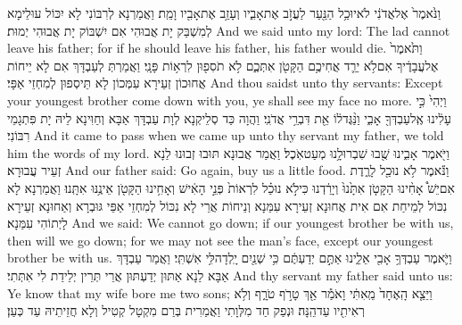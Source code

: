 {וַנֹּ֙אמֶר֙ אֶל\maqqaf אֲדֹנִ֔י לֹא\maqqaf יוּכַ֥ל הַנַּ֖עַר לַעֲזֹ֣ב אֶת\maqqaf אָבִ֑יו וְעָזַ֥ב אֶת\maqqaf אָבִ֖יו וָמֵֽת׃}
{וַאֲמַרְנָא לְרִבּוֹנִי לָא יִכּוֹל עוּלֵימָא לְמִשְׁבַּק יָת אֲבוּהִי אִם יִשְׁבּוֹק יָת אֲבוּהִי יְמוּת׃}
{And we said unto my lord: The lad cannot leave his father; for if he should leave his father, his father would die.}{}
{וַתֹּ֙אמֶר֙ אֶל\maqqaf עֲבָדֶ֔יךָ אִם\maqqaf לֹ֥א יֵרֵ֛ד אֲחִיכֶ֥ם הַקָּטֹ֖ן אִתְּכֶ֑ם לֹ֥א תֹסִפ֖וּן לִרְא֥וֹת פָּנָֽי׃}
{וַאֲמַרְתְּ לְעַבְדָּךְ אִם לָא יֵיחוֹת אֲחוּכוֹן זְעֵירָא עִמְּכוֹן לָא תֵּיסְפוּן לְמִחְזֵי אַפָּי׃}
{And thou saidst unto thy servants: Except your youngest brother come down with you, ye shall see my face no more.}{}
{וַיְהִי֙ כִּ֣י עָלִ֔ינוּ אֶֽל\maqqaf עַבְדְּךָ֖ אָבִ֑י וַנַּ֨גֶּד\maqqaf ל֔וֹ אֵ֖ת דִּבְרֵ֥י אֲדֹנִֽי׃}
{וַהֲוָה כַּד סְלֵיקְנָא לְוָת עַבְדָּךְ אַבָּא וְחַוִּינָא לֵיהּ יָת פִּתְגָמֵי רִבּוֹנִי׃}
{And it came to pass when we came up unto thy servant my father, we told him the words of my lord.}{}
{וַיֹּ֖אמֶר אָבִ֑ינוּ שֻׁ֖בוּ שִׁבְרוּ\maqqaf לָ֥נוּ מְעַט\maqqaf אֹֽכֶל׃}
{וַאֲמַר אֲבוּנָא תּוּבוּ זְבוּנוּ לַנָא זְעֵיר עֲבוּרָא׃}
{And our father said: Go again, buy us a little food.}{}
{וַנֹּ֕אמֶר לֹ֥א נוּכַ֖ל לָרֶ֑דֶת אִם\maqqaf יֵשׁ֩ אָחִ֨ינוּ הַקָּטֹ֤ן אִתָּ֙נוּ֙ וְיָרַ֔דְנוּ כִּי\maqqaf לֹ֣א נוּכַ֗ל לִרְאוֹת֙ פְּנֵ֣י הָאִ֔ישׁ וְאָחִ֥ינוּ הַקָּטֹ֖ן אֵינֶ֥נּוּ אִתָּֽנוּ׃}
{וַאֲמַרְנָא לָא נִכּוֹל לְמֵיחַת אִם אִית אֲחוּנָא זְעֵירָא עִמַּנָא וְנֵיחוֹת אֲרֵי לָא נִכּוֹל לְמִחְזֵי אַפֵּי גּוּבְרָא וְאַחוּנָא זְעֵירָא לָיְתוֹהִי עִמַּנָא׃}
{And we said: We cannot go down; if our youngest brother be with us, then will we go down; for we may not see the man’s face, except our youngest brother be with us.}{}
{וַיֹּ֛אמֶר עַבְדְּךָ֥ אָבִ֖י אֵלֵ֑ינוּ אַתֶּ֣ם יְדַעְתֶּ֔ם כִּ֥י שְׁנַ֖יִם יָֽלְדָה\maqqaf לִּ֥י אִשְׁתִּֽי׃}
{וַאֲמַר עַבְדָּךְ אַבָּא לַנָא אַתּוּן יְדַעְתּוּן אֲרֵי תְּרֵין יְלֵידַת לִי אִתְּתִי׃}
{And thy servant my father said unto us: Ye know that my wife bore me two sons;}{}
{וַיֵּצֵ֤א הָֽאֶחָד֙ מֵֽאִתִּ֔י וָאֹמַ֕ר אַ֖ךְ טָרֹ֣ף טֹרָ֑ף וְלֹ֥א רְאִיתִ֖יו עַד\maqqaf הֵֽנָּה׃}
{וּנְפַק חַד מִלְּוָתִי וַאֲמַרִית בְּרַם מִקְטָל קְטִיל וְלָא חֲזֵיתֵיהּ עַד כְּעַן׃}
